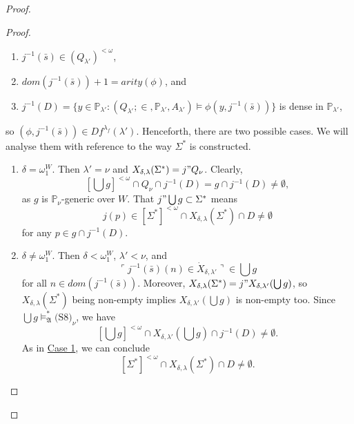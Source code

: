 \documentclass[12pt, twoside]{memoir}
\numberwithin{equation}{section}
\theoremstyle{definition}
\theoremstyle{remark}
\theoremstyle{definition}
\theoremstyle{definition}
\theoremstyle{definition}
\theoremstyle{remark}
\newcommand{\eq}{=}
\begin{document}
\begin{proof}
\begin{proof}
\begin{enumerate}[label=<$k$> $\eq$ \arabic* :, leftmargin=70pt]
\begin{enumerate}[label=(\alph*)]
        \item $j^{-1}(\bar{s}) \in (Q_{\lambda'})^{< \omega}$, 
        \item $dom(j^{-1}(\bar{s})) + 1 = arity(\phi)$, and
        \item $j^{-1}(D) = \{y \in \mathbb{P}_{\lambda'} : (Q_{\lambda'}; \in, \mathbb{P}_{\lambda'}, A_{\lambda'}) \models \phi(y, j^{-1}(\bar{s}))\}$ is dense in $\mathbb{P}_{\lambda'}$,
    \end{enumerate}
    so $(\phi, j^{-1}(\bar{s})) \in Df^{\lambda_f}(\lambda')$. Henceforth, there are two possible cases. We will analyse them with reference to the way $\Sigma^*$ is constructed. 
    \begin{enumerate}[label=Case \arabic*:, leftmargin=50pt]
        \item\label{c8c1} $\delta = \omega_1^W$. Then $\lambda' = \nu$ and $X_{\delta, \lambda}(\Sigma^*) = j" Q_{\nu}$. Clearly, $$[\bigcup g]^{< \omega} \cap Q_{\nu} \cap j^{-1}(D) = g \cap j^{-1}(D) \neq \emptyset,$$ as $g$ is $\mathbb{P}_{\nu}$-generic over $W$. That $j" \bigcup g \subset \Sigma^*$ means $$j(p) \in [\Sigma^*]^{< \omega} \cap X_{\delta, \lambda}(\Sigma^*) \cap D \neq \emptyset$$ for any $p \in g \cap j^{-1}(D)$.
        \item $\delta \neq \omega_1^W$. Then $\delta < \omega_1^W$, $\lambda' < \nu$, and $$\ulcorner j^{-1}(\bar{s})(n) \in \dot{X}_{\delta, \lambda'} \urcorner \in \bigcup g$$ for all $n \in dom(j^{-1}(\bar{s}))$. Moreover, $X_{\delta, \lambda}(\Sigma^*) = j" X_{\delta, \lambda'}(\bigcup g)$, so $X_{\delta, \lambda}(\Sigma^*)$ being non-empty implies $X_{\delta, \lambda'}(\bigcup g)$ is non-empty too. Since $\bigcup g \models^*_{\mathfrak{A}} \hyperref[c8]{\text{(S8)}_{\nu}}$, we have $$[\bigcup g]^{< \omega} \cap X_{\delta, \lambda'}(\bigcup g) \cap j^{-1}(D) \neq \emptyset.$$ As in \hyperref[c8c1]{Case 1}, we can conclude $$[\Sigma^*]^{< \omega} \cap X_{\delta, \lambda}(\Sigma^*) \cap D \neq \emptyset.$$
    \end{enumerate}
\end{enumerate}


\end{proof}
\end{proof}
\end{document}
